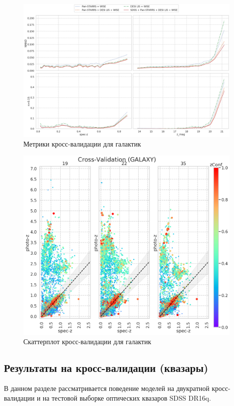 \documentclass[fleqn,usenatbib]{mnras}
\begin{document}
\begin{figure}
    \centering
    \includegraphics[width=0.9\linewidth]{images/metrics-cv2-gal.png}
    \caption{Метрики кросс-валидации для галактик}
    \label{fig:metrics-cv2-gal}
\end{figure}

\begin{figure}
    \centering
    \includegraphics[width=0.9\linewidth]{images/scatterplots-cv2-gal.png}
    \caption{Скаттерплот кросс-валидации для галактик}
    \label{fig:metrics-cv2-qso}
\end{figure}

\subsection{Результаты на кросс-валидации (квазары)}
В данном разделе рассматривается поведение моделей на двукратной кросс-валидации и на тестовой выборке оптических квазаров SDSS DR16q.
\end{document}
